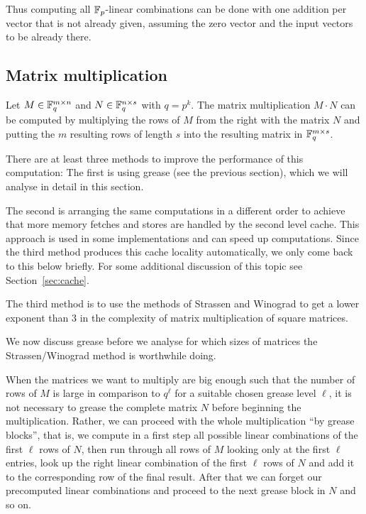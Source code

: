 \begin{Rem}
Thus computing all $\mathbb{F}_p$-linear combinations can be done
with one addition per vector that is not already given, assuming
the zero vector and the input vectors to be already there.
\end{Rem}

\subsection{Matrix multiplication}

Let $M \in \mathbb{F}_q^{m \times n}$ and $N \in \mathbb{F}_q^{n \times s}$ with $q = p^k$.
The matrix multiplication $M \cdot N$ can be computed by multiplying the
rows of $M$ from the right with the matrix $N$ and putting the $m$ resulting
rows of length $s$ into the resulting matrix in $\mathbb{F}_q^{m \times s}$.

There are at least three methods to improve the performance of this
computation: The first is using grease (see the previous section), which
we will analyse in detail in this section. 

The second is arranging the same computations in a different order to 
achieve that more memory fetches and stores are handled by the second
level cache. This approach is used in some implementations and can
speed up computations. Since the third method produces this cache locality
automatically, we only come back to this below briefly.
For some additional discussion of this topic see Section~\ref{sec:cache}. 

The third method is to use the methods of Strassen and Winograd to
get a lower exponent than $3$ in the complexity of matrix multiplication
of square matrices.

We now discuss grease before we analyse for which sizes of
matrices the Strassen/Winograd method is worthwhile doing.

When the matrices we want to multiply are big enough such that the number
of rows of $M$ is large in comparison to $q^\ell$
for a suitable chosen grease level $\ell$, it is not necessary to grease
the complete matrix $N$ before beginning the multiplication. Rather,
we can proceed with the whole multiplication ``by grease blocks'', that
is, we compute in a first step all possible linear combinations of the
first $\ell$ rows of $N$, then run through all rows of $M$ looking
only at the first $\ell$ entries, look up the right
linear combination of the first $\ell$ rows of $N$ and add it 
to the corresponding
row of the final result. After that we can forget our precomputed linear
combinations and proceed to the next grease block in $N$ and so on.


